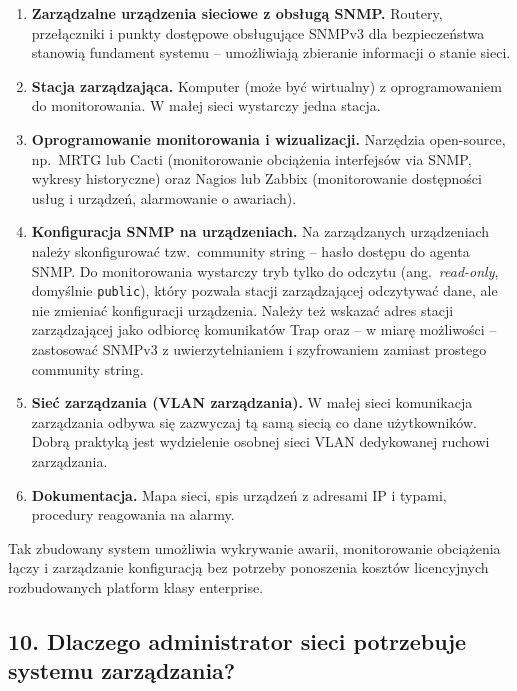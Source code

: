 \documentclass[12pt,a4paper]{article}
\begin{document}
\begin{enumerate}
  \item \textbf{Zarządzalne urządzenia sieciowe z obsługą SNMP.}
        Routery, przełączniki i punkty dostępowe obsługujące SNMPv3 dla bezpieczeństwa stanowią fundament
        systemu -- umożliwiają zbieranie informacji o stanie sieci.
  \item \textbf{Stacja zarządzająca.}
        Komputer (może być wirtualny) z oprogramowaniem do monitorowania.
        W małej sieci wystarczy jedna stacja.
  \item \textbf{Oprogramowanie monitorowania i wizualizacji.}
        Narzędzia open-source, np.\ MRTG lub Cacti (monitorowanie obciążenia
        interfejsów via SNMP, wykresy historyczne) oraz Nagios lub Zabbix
        (monitorowanie dostępności usług i urządzeń, alarmowanie o awariach).
  \item \textbf{Konfiguracja SNMP na urządzeniach.}
        Na zarządzanych urządzeniach należy skonfigurować tzw.\ community
        string -- hasło dostępu do agenta SNMP. Do monitorowania wystarczy
        tryb tylko do odczytu (ang.\ \emph{read-only}, domyślnie \texttt{public}),
        który pozwala stacji zarządzającej odczytywać dane, ale nie zmieniać
        konfiguracji urządzenia. Należy też wskazać adres stacji zarządzającej
        jako odbiorcę komunikatów Trap oraz -- w miarę możliwości -- zastosować
        SNMPv3 z uwierzytelnianiem i szyfrowaniem zamiast prostego community string.
  \item \textbf{Sieć zarządzania (VLAN zarządzania).}
        W małej sieci komunikacja zarządzania odbywa się zazwyczaj tą samą
        siecią co dane użytkowników. Dobrą praktyką jest wydzielenie osobnej
        sieci VLAN dedykowanej ruchowi zarządzania.
  \item \textbf{Dokumentacja.}
        Mapa sieci, spis urządzeń z adresami IP i typami, procedury reagowania
        na alarmy.
\end{enumerate}

Tak zbudowany system umożliwia wykrywanie awarii, monitorowanie obciążenia
łączy i zarządzanie konfiguracją bez potrzeby ponoszenia kosztów licencyjnych
rozbudowanych platform klasy enterprise.

\subsection*{10. Dlaczego administrator sieci potrzebuje systemu zarządzania?}
\end{document}
